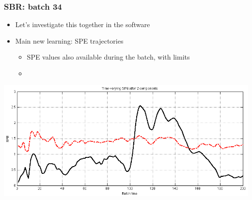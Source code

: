 \begin{frame}\frametitle{SBR:  batch 34}
	
	\begin{itemize}		
		\item	Let's investigate this together in the software
		
		\item	Main new learning: SPE trajectories
		
				\begin{itemize}
					\item	SPE values also available during the batch, with limits
					
					\item	{}
					
				\end{itemize}
	\end{itemize}
				
	\begin{center}
		\includegraphics[width=\textwidth]{images/sbr/SBR-time-evolving-SPE-batch-34.png}
	\end{center}
\end{frame}

\begin{frame}\frametitle{}

\end{frame}



